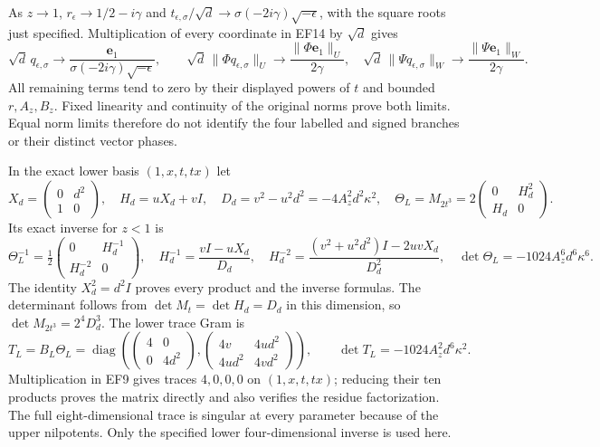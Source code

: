 As $z\to1$, $r_\epsilon\to1/2-i\gamma$ and
$t_{\epsilon,\sigma}/\sqrt d\to
\sigma(-2i\gamma)\sqrt{-\epsilon}$, with the square
roots just specified. Multiplication of every coordinate
in EF14 by $\sqrt d$ gives
\begin{equation}
 \sqrt d\,q_{\epsilon,\sigma}
 \longrightarrow\frac{\mathbf e_1}
       {\sigma(-2i\gamma)\sqrt{-\epsilon}},\qquad
 \sqrt d\,\|\Phi q_{\epsilon,\sigma}\|_U
 \longrightarrow\frac{\|\Phi\mathbf e_1\|_U}{2\gamma},\quad
 \sqrt d\,\|\Psi q_{\epsilon,\sigma}\|_W
 \longrightarrow\frac{\|\Psi\mathbf e_1\|_W}{2\gamma}.
 \tag{EF15}
\end{equation}
All remaining terms tend to zero by their displayed
powers of $t$ and bounded $r,A_z,B_z$. Fixed linearity
and continuity of the original norms prove both limits.
Equal norm limits therefore do not identify the four
labelled and signed branches or their distinct vector phases.

In the exact lower basis $(1,x,t,tx)$ let
\begin{equation}
 X_d=\begin{pmatrix}0&d^2\\1&0\end{pmatrix},\quad
 H_d=uX_d+vI,\quad D_d=v^2-u^2d^2=-4A_z^2d^2\kappa^2,\quad
 \Theta_L=M_{2t^3}=2\begin{pmatrix}0&H_d^2\\H_d&0\end{pmatrix}.
 \tag{EF16}
\end{equation}
Its exact inverse for $z<1$ is
\begin{equation}
 \Theta_L^{-1}=\tfrac12\begin{pmatrix}0&H_d^{-1}\\H_d^{-2}&0\end{pmatrix},\quad
 H_d^{-1}=\frac{vI-uX_d}{D_d},\quad
 H_d^{-2}=\frac{(v^2+u^2d^2)I-2uvX_d}{D_d^2},\quad
 \det\Theta_L=-1024A_z^6d^6\kappa^6.
 \tag{EF17}
\end{equation}
The identity $X_d^2=d^2I$ proves every product and the
inverse formulas. The determinant follows from
$\det M_t=\det H_d=D_d$ in this dimension, so
$\det M_{2t^3}=2^4D_d^3$. The lower trace Gram is
\begin{equation}
 T_L=B_L\Theta_L=
 \operatorname{diag}\left(
 \begin{pmatrix}4&0\\0&4d^2\end{pmatrix},
 \begin{pmatrix}4v&4ud^2\\4ud^2&4vd^2\end{pmatrix}\right),
 \qquad\det T_L=-1024A_z^2d^6\kappa^2.
 \tag{EF18}
\end{equation}
Multiplication in EF9 gives traces $4,0,0,0$ on
$(1,x,t,tx)$; reducing their ten products proves the
matrix directly and also verifies the residue factorization.
The full eight-dimensional trace is singular at every
parameter because of the upper nilpotents. Only the
specified lower four-dimensional inverse is used here.


